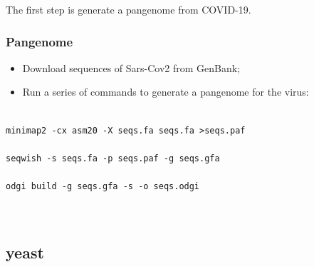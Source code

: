 The first step is generate a pangenome from COVID-19.


\subsubsection{Pangenome}


\begin{itemize}
\item  Download sequences of Sars-Cov2 from GenBank;
\item Run a series of commands to generate a pangenome for the virus:
\end{itemize}
\begin{verbatim}

minimap2 -cx asm20 -X seqs.fa seqs.fa >seqs.paf

seqwish -s seqs.fa -p seqs.paf -g seqs.gfa

odgi build -g seqs.gfa -s -o seqs.odgi

    
\end{verbatim}













\subsection{yeast}

